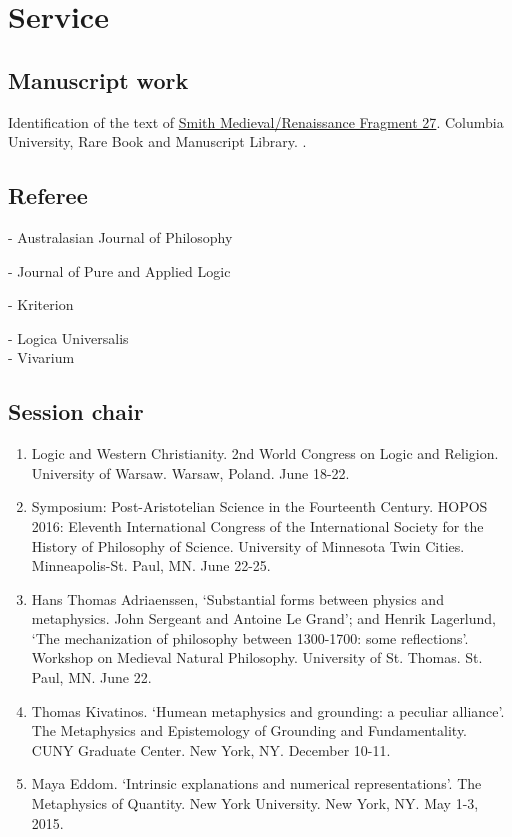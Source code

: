 \section{Service}
\subsection{Manuscript work}
Identification of the text of \href{https://digital-scriptorium.org/xtf3/search?rmode=digscript;smode=basic;text=Jacob\%20Archambault;docsPerPage=1;startDoc=1;fullview=yes}{Smith Medieval/Renaissance Fragment 27}. Columbia University, Rare Book and Manuscript Library. .
\subsection{Referee}
\begin{multicols}{2}
- Australasian Journal of Philosophy

- Journal of Pure and Applied Logic

- Kriterion

\columnbreak
- Logica Universalis\\
- Vivarium
\end{multicols}

\subsection{Session chair}
\begin{enumerate}
	\item {}
{}
{Logic and Western Christianity. 2nd World Congress on Logic and Religion. University of Warsaw. Warsaw, Poland. June 18-22.}
{}
\item {}
{}
{Symposium: Post-Aristotelian Science in the Fourteenth Century. HOPOS 2016: Eleventh International Congress of the International Society for the History of Philosophy of Science. University of Minnesota Twin Cities. Minneapolis-St. Paul, MN. June 22-25.}
{}
\item \datedsubsectionnarrow{}
{}
{Hans Thomas Adriaenssen, ‘Substantial forms between physics and metaphysics. John Sergeant and Antoine Le Grand’; and Henrik Lagerlund, ‘The mechanization of philosophy between 1300-1700: some reflections’. Workshop on Medieval Natural Philosophy. University of St. Thomas. St. Paul, MN. June 22.}
{}
\item {}
{}
{Thomas Kivatinos. ‘Humean metaphysics and grounding: a peculiar alliance’. The Metaphysics and Epistemology of Grounding and Fundamentality. CUNY Graduate Center. New York, NY. December 10-11.}
{}
\item \datedsubsectionnarrow{}
{}
{Maya Eddom. ‘Intrinsic explanations and numerical representations’. The Metaphysics of Quantity. New York University. New York, NY. May 1-3, 2015.}
{}
\end{enumerate}
